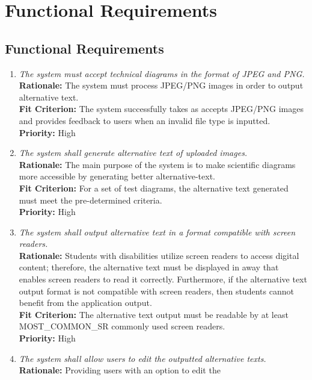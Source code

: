 \documentclass[12pt]{article}
\begin{document}
\section{Functional Requirements}
\subsection{Functional Requirements}
\begin{enumerate}[label=FR \arabic*., wide=0pt, leftmargin=*]
  \item \emph{The system must accept technical diagrams in the format
    of JPEG and PNG.}\\[2mm]
    {\bf Rationale:} The system must process JPEG/PNG images in order
    to output alternative text. \\
    {\bf Fit Criterion:} The system successfully takes as accepts
    JPEG/PNG images and provides feedback to users when an invalid
    file type is inputted.  \\
    {\bf Priority:} High
  \item \emph{The system shall generate alternative text of uploaded
    images.}\\[2mm]
    {\bf Rationale:} The main purpose of the system is to make
    scientific diagrams more accessible by generating better
    alternative-text. \\
    {\bf Fit Criterion:} For a set of test diagrams, the alternative
    text generated must meet the pre-determined criteria.\\
    {\bf Priority:} High
  \item \emph{The system shall output alternative text in a format
    compatible with screen readers.}\\[2mm]
    {\bf Rationale:} Students with disabilities utilize screen
    readers to access digital content; therefore, the alternative
    text must be displayed in away that enables screen readers to
    read it correctly. Furthermore, if the alternative text output
    format is not compatible with screen readers, then students
    cannot benefit from the application output.\\
    {\bf Fit Criterion:} The alternative text output must be readable
    by at least MOST\_COMMON\_SR commonly used screen readers.\\
    {\bf Priority:} High
  \item \emph{The system shall allow users to edit the outputted
    alternative texts.}\\[2mm]
    {\bf Rationale:} Providing users with an option to edit the

\end{enumerate}
\end{document}
